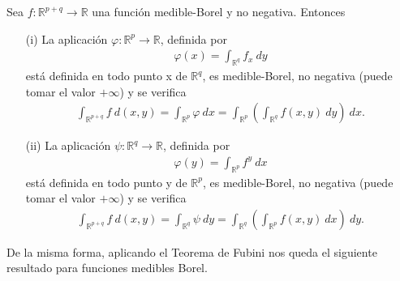 \begin{cor}
Sea $f: \mathbb{R}^{p+q} \longrightarrow \mathbb{R}$ una función medible-Borel y no negativa. Entonces
\begin{enumerate}
    \item[(i)] La aplicación $\varphi: \mathbb{R}^p \longrightarrow \mathbb{R}$, definida por
    \begin{align*}
        \varphi(x) = \int_{\mathbb{R}^q}{f_x \ dy}
    \end{align*}
    está definida en todo punto x de $\mathbb{R}^q$, es medible-Borel, no negativa (puede tomar el valor $+\infty$) y se verifica
    \begin{align*}
        \int_{\mathbb{R}^{p+q}}{f \ d(x,y)} = \int_{\mathbb{R}^p}{\varphi \ dx} = \int_{\mathbb{R}^p}\left( \int_{\mathbb{R}^q}{f(x,y) \ dy}\right) \ dx.
    \end{align*}
    \item[(ii)] La aplicación $\psi: \mathbb{R}^q \longrightarrow \mathbb{R}$, definida por
    \begin{align*}
        \varphi(y) = \int_{\mathbb{R}^p}{f^y \ dx}
    \end{align*}
    está definida en todo punto y de $\mathbb{R}^p$, es medible-Borel, no negativa (puede tomar el valor $+\infty$) y se verifica
    \begin{align*}
        \int_{\mathbb{R}^{p+q}}{f \ d(x,y)} = \int_{\mathbb{R}^q}{\psi \ dy} = \int_{\mathbb{R}^q}\left( \int_{\mathbb{R}^p}{f(x,y) \ dx}\right) \ dy.
    \end{align*}
\end{enumerate}
\end{cor}

De la misma forma, aplicando el Teorema de Fubini nos queda el siguiente resultado para funciones medibles Borel.

